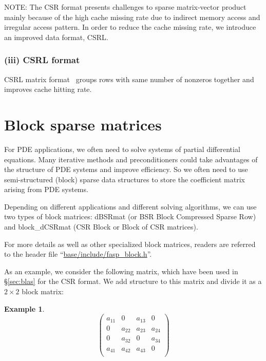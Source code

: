 \documentclass[11pt]{memoir}
\newtheorem{example}[theorem]{Example}
\begin{document}
\begin{snugshade}\noindent
NOTE: The CSR format presents challenges to sparse matrix-vector product mainly because of the high cache missing rate due to indirect memory access and irregular access pattern. In order to reduce the cache missing rate, we introduce an improved data format, CSRL.
\end{snugshade}

\subsubsection*{(iii) CSRL format}

CSRL matrix format~\cite{Mellor-crummey2004} groups rows with same number of nonzeros together and improves cache hitting rate.
%

%

\section{Block sparse matrices}

For PDE applications, we often need to solve systems of partial differential equations. Many iterative methods and preconditioners could take advantages of the structure of PDE systems and improve efficiency. So we often need to use semi-structured (block) sparse data structures to store the coefficient matrix arising from PDE systems. 

Depending on different applications and different solving algorithms, we can use two types of block matrices: dBSRmat (or BSR Block Compressed Sparse Row) and block\_dCSRmat (CSR Block or Block of CSR matrices). 

\begin{snugshade}\noindent
For more details as well as other specialized block matrices, readers are referred to the header file ``\url{base/include/fasp\_block.h}''.
\end{snugshade}

As an example, we consider the following matrix, which have been used in \S\ref{sec:blas} for the CSR format. We add structure to this matrix and divide it as a $2 \times 2$ block matrix:
%
\begin{example}\label{ex:block}
$$
\left(
\begin{array}{cc|cc}
a_{11} & 0 & a_{13} & 0 \\
0 & a_{22} & a_{23} & a_{24} \\
\hline
0 & a_{32} & 0 & a_{34} \\
a_{41}& a_{42} & a_{43} & 0 \\
\end{array}
\right)
$$
\end{example}
\end{document}
